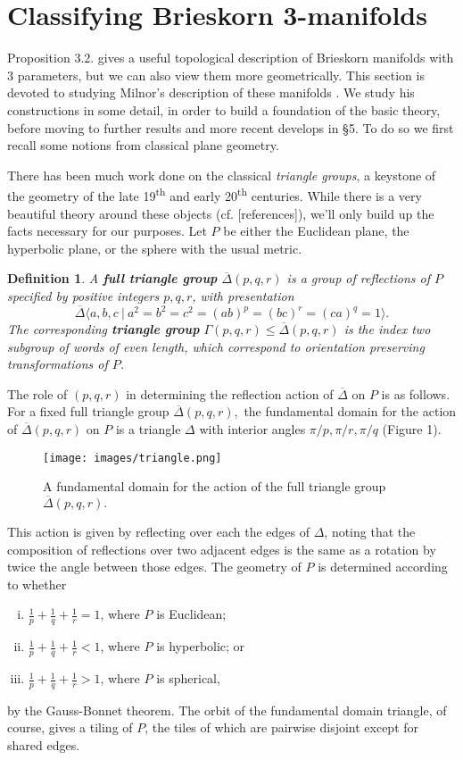 \documentclass{article}
\newtheorem{definition}{Definition}[section]
\begin{document}
\section{Classifying Brieskorn 3-manifolds}

Proposition 3.2. gives a useful topological description of Brieskorn manifolds with $3$ parameters, but we can also view them more geometrically. This section is devoted to studying Milnor's description of these manifolds \cite{milnor_1975}. We study his constructions in some detail, in order to build a foundation of the basic theory, before moving to further results and more recent develops in \S 5. To do so we first recall some notions from classical plane geometry.

There has been much work done on the classical \textit{triangle groups}, a keystone of the geometry of the late 19\textsuperscript{th} and early 20\textsuperscript{th} centuries. While there is a very beautiful theory around these objects (cf. [references]), we'll only build up the facts necessary for our purposes. Let $P$ be either the Euclidean plane, the hyperbolic plane, or the sphere with the usual metric.
\begin{definition}
A \textbf{full triangle group} $\overline{\Delta}(p,q,r)$ is a group of reflections of $P$ specified by positive integers $p,q,r$, with presentation
\[\overline{\Delta}\langle a,b,c\ |\ a^2 = b^2 = c^2 = (ab)^p = (bc)^r = (ca)^q = 1\rangle.\]
The corresponding \textbf{triangle group} $\Gamma(p,q,r) \leq \overline{\Delta}(p,q,r)$ is the index two subgroup of words of even length, which correspond to orientation preserving transformations of $P$.
\end{definition}
The role of $(p,q,r)$ in determining the reflection action of $\overline{\Delta}$ on $P$ is as follows. For a fixed full triangle group $\overline{\Delta}(p,q,r),$ the fundamental domain for the action of $\overline{\Delta}(p,q,r)$ on $P$ is a triangle $\Delta$ with interior angles $\pi/p, \pi/r, \pi/q$ (Figure 1).
\begin{figure}
    \centering
    \texttt{[image: images/triangle.png]}
    \caption{A fundamental domain for the action of the full triangle group $\overline{\Delta}(p,q,r).$}
\end{figure}
This action is given by reflecting over each the edges of $\Delta$, noting that the composition of reflections over two adjacent edges is the same as a rotation by twice the angle between those edges. The geometry of $P$ is determined according to whether
\begin{enumerate}[(i)]
    \item $\frac{1}{p} + \frac{1}{q} + \frac{1}{r} = 1$, where $P$ is Euclidean;
    \item $\frac{1}{p} + \frac{1}{q} + \frac{1}{r} < 1$, where $P$ is hyperbolic; or
    \item $\frac{1}{p} + \frac{1}{q} + \frac{1}{r} > 1$, where $P$ is spherical,
\end{enumerate}
by the Gauss-Bonnet theorem. The orbit of the fundamental domain triangle, of course, gives a tiling of $P$, the tiles of which are pairwise disjoint except for shared edges.
\end{document}
